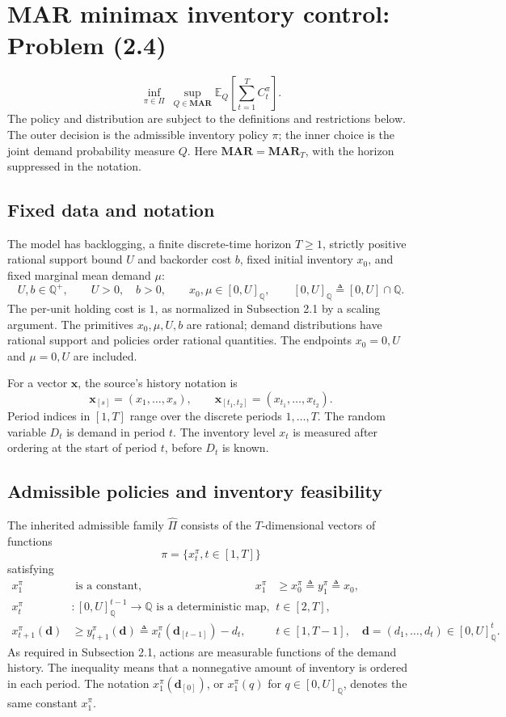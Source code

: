 \documentclass{article}
\begin{document}
\section*{MAR minimax inventory control: Problem (2.4)}
\begin{equation}
\inf_{\pi\in\Pi}\ \sup_{Q\in\mathbf{MAR}}
\mathbb{E}_{Q}\left[\sum_{t=1}^{T}C_t^\pi\right].
\tag{2.4}
\end{equation}
The policy and distribution are subject to the definitions and restrictions below. The outer decision is the admissible inventory policy \(\pi\); the inner choice is the joint demand probability measure \(Q\). Here \(\mathbf{MAR}=\mathbf{MAR}_T\), with the horizon suppressed in the notation.

\subsection*{Fixed data and notation}
The model has backlogging, a finite discrete-time horizon \(T\geq1\), strictly positive rational support bound \(U\) and backorder cost \(b\), fixed initial inventory \(x_0\), and fixed marginal mean demand \(\mu\):
\[
U,b\in\mathbb{Q}^{+},\qquad U>0,\quad b>0,\qquad
x_0,\mu\in[0,U]_{\mathbb{Q}},
\qquad [0,U]_{\mathbb{Q}}\triangleq[0,U]\cap\mathbb{Q}.
\]
The per-unit holding cost is \(1\), as normalized in Subsection 2.1 by a scaling argument. The primitives \(x_0,\mu,U,b\) are rational; demand distributions have rational support and policies order rational quantities. The endpoints \(x_0=0,U\) and \(\mu=0,U\) are included.

For a vector \(\mathbf{x}\), the source's history notation is
\[
\mathbf{x}_{[s]}=(x_1,\ldots,x_s),\qquad
\mathbf{x}_{[t_1,t_2]}=(x_{t_1},\ldots,x_{t_2}).
\]
Period indices in \([1,T]\) range over the discrete periods \(1,\ldots,T\). The random variable \(D_t\) is demand in period \(t\). The inventory level \(x_t\) is measured after ordering at the start of period \(t\), before \(D_t\) is known.

\subsection*{Admissible policies and inventory feasibility}
The inherited admissible family \(\hat\Pi\) consists of the \(T\)-dimensional vectors of functions
\[
\pi=\{x_t^\pi,t\in[1,T]\}
\]
satisfying
\begin{align*}
x_1^\pi&\text{ is a constant},&
x_1^\pi&\geq x_0^\pi\triangleq y_1^\pi\triangleq x_0,\\
x_t^\pi&:[0,U]_{\mathbb{Q}}^{t-1}\longrightarrow\mathbb{Q}
\text{ is a deterministic map},&&t\in[2,T],\\
x_{t+1}^\pi(\mathbf d)&\geq y_{t+1}^\pi(\mathbf d)
\triangleq x_t^\pi(\mathbf d_{[t-1]})-d_t,
&&t\in[1,T-1],\quad
\mathbf d=(d_1,\ldots,d_t)\in[0,U]_{\mathbb{Q}}^t.
\end{align*}
As required in Subsection 2.1, actions are measurable functions of the demand history. The inequality means that a nonnegative amount of inventory is ordered in each period. The notation \(x_1^\pi(\mathbf d_{[0]})\), or \(x_1^\pi(q)\) for \(q\in[0,U]_{\mathbb{Q}}\), denotes the same constant \(x_1^\pi\).
\end{document}
